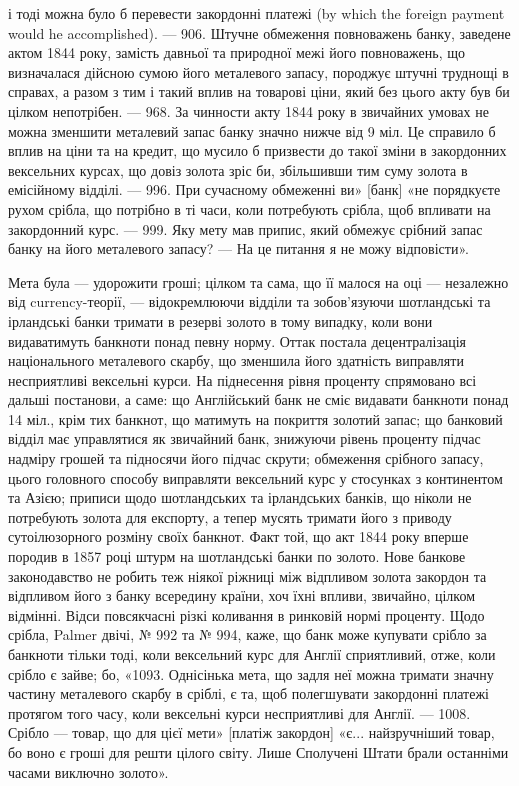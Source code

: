 \parcont{}  %
і тоді можна було б перевести закордонні платежі (by which the foreign payment
would he accomplished). — 906. Штучне обмеження повноважень банку, заведене
актом 1844 року, замість давньої та природної межі його повноважень, що визначалася
дійсною сумою його металевого запасу, породжує штучні труднощі в
справах, а разом з тим і такий вплив на товарові ціни, який без цього акту
був би цілком непотрібен. — 968. За чинности акту 1844 року в звичайних
умовах не можна зменшити металевий запас банку значно нижче від 9 міл.
Це справило б вплив на ціни та на кредит, що мусило б призвести до такої
зміни в закордонних вексельних курсах, що довіз золота зріс би, збільшивши
тим суму золота в емісійному відділі. — 996. При сучасному обмеженні ви»
[банк] «не порядкуєте рухом срібла, що потрібно в ті часи, коли потребують
срібла, щоб впливати на закордонний курс. — 999. Яку мету мав припис, який
обмежує срібний запас банку на  його металевого запасу? — На це питання
я не можу відповісти».

Мета була — удорожити гроші; цілком та сама, що її малося на оці —
незалежно від currency-теорії, — відокремлюючи відділи та зобов’язуючи шотландські
та ірландські банки тримати в резерві золото в тому випадку, коли
вони видаватимуть банкноти понад певну норму. Оттак постала децентралізація
національного металевого скарбу, що зменшила його здатність виправляти несприятливі
вексельні курси. На піднесення рівня проценту спрямовано всі дальші
постанови, а саме: що Англійський банк не сміє видавати банкноти понад 14 міл.,
крім тих банкнот, що матимуть на покриття золотий запас; що банковий відділ має
управлятися як звичайний банк, знижуючи рівень проценту підчас надміру
грошей та підносячи його підчас скрути; обмеження срібного запасу, цього
головного способу виправляти вексельний курс у стосунках з континентом та
Азією; приписи щодо шотландських та ірландських банків, що ніколи не потребують
золота для експорту, а тепер мусять тримати його з приводу сутоілюзорного
розміну своїх банкнот. Факт той, що акт 1844 року вперше породив
в 1857 році штурм на шотландські банки по золото. Нове банкове
законодавство не робить теж ніякої ріжниці між відпливом золота закордон та
відпливом його з банку всередину країни, хоч їхні впливи, звичайно, цілком
відмінні. Відси повсякчасні різкі коливання в ринковій нормі проценту. Щодо
срібла, Palmer двічі, № 992 та № 994, каже, що банк може купувати срібло
за банкноти тільки тоді, коли вексельний курс для Англії сприятливий, отже,
коли срібло є зайве; бо, «1093. Однісінька мета, що задля неї можна тримати
значну частину металевого скарбу в сріблі, є та, щоб полегшувати закордонні
платежі протягом того часу, коли вексельні курси несприятливі для Англії. —
1008. Срібло — товар, що для цієї мети» [платіж закордон] «є... найзручніший
товар, бо воно є гроші для решти цілого світу. Лише Сполучені Штати брали
останніми часами виключно золото».

